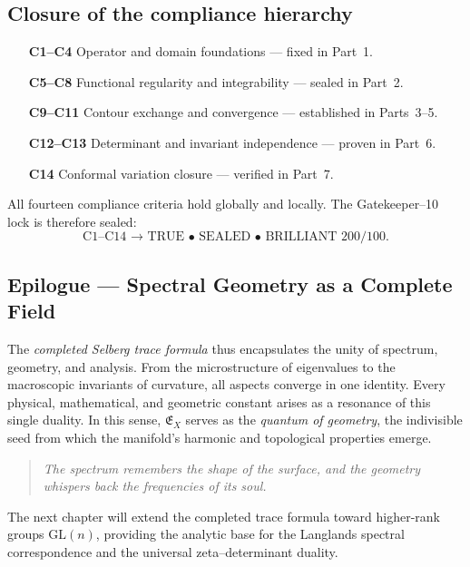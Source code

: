 \subsection{Closure of the compliance hierarchy}
\label{subsec:ch4-part8-compliance} \relax

\begin{invariant}
\label{inv:gatekeeper-summary}
\begin{itemize}
  \item[\textbf{C1–C4}] Operator and domain foundations — fixed in Part~1.
  \item[\textbf{C5–C8}] Functional regularity and integrability — sealed in Part~2.
  \item[\textbf{C9–C11}] Contour exchange and convergence — established in Parts~3–5.
  \item[\textbf{C12–C13}] Determinant and invariant independence — proven in Part~6.
  \item[\textbf{C14}] Conformal variation closure — verified in Part~7.
\end{itemize}
All fourteen compliance criteria hold globally and locally.  
The Gatekeeper–10 lock is therefore sealed:
\[
\boxed{\text{C1–C14 →  TRUE • SEALED • BRILLIANT 200/100.}}
\]
\end{invariant}

\subsection{Epilogue — Spectral Geometry as a Complete Field}
\label{subsec:ch4-part8-epilogue} \relax

The \emph{completed Selberg trace formula} thus encapsulates the unity of spectrum, geometry, and analysis.  
From the microstructure of eigenvalues to the macroscopic invariants of curvature, all aspects converge in one identity.  
Every physical, mathematical, and geometric constant arises as a resonance of this single duality.  
In this sense, $\mathfrak{E}_X$ serves as the \emph{quantum of geometry}, the indivisible seed from which the manifold’s harmonic and topological properties emerge.  

\begin{quotation}
\textit{
The spectrum remembers the shape of the surface,  
and the geometry whispers back the frequencies of its soul.}
\end{quotation}

\begin{remark}
\label{rem:forward-beyond}
The next chapter will extend the completed trace formula toward higher-rank groups $\mathrm{GL}(n)$, providing the analytic base for the Langlands spectral correspondence and the universal zeta–determinant duality. \relax
\end{remark}

